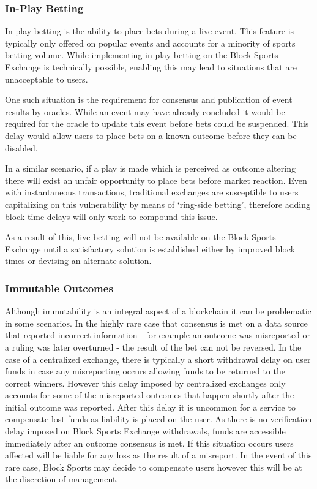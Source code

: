 \documentclass{article}
\begin{document}
		\subsubsection{In-Play Betting}
In-play betting is the ability to place bets during a live event. This feature is typically only offered on popular events and accounts for a minority of sports betting volume. While implementing in-play betting on the Block Sports Exchange is technically possible, enabling this may lead to situations that are unacceptable to users.
 
One such situation is the requirement for consensus and publication of event results by oracles. While an event may have already concluded it would be required for the oracle to update this event before bets could be suspended. This delay would allow users to place bets on a known outcome before they can be disabled.
 
In a similar scenario, if a play is made which is perceived as outcome altering there will exist an unfair opportunity to place bets before market reaction. Even with instantaneous transactions, traditional exchanges are susceptible to users capitalizing on this vulnerability by means of ‘ring-side betting’, therefore adding block time delays will only work to compound this issue. 

As a result of this, live betting will not be available on the Block Sports Exchange until a satisfactory solution is established either by improved block times or devising an alternate solution.

		\subsubsection{Immutable Outcomes}
Although immutability is an integral aspect of a blockchain it can be problematic in some scenarios. In the highly rare case that consensus is met on a data source that reported incorrect information - for example an outcome was misreported or a ruling was later overturned - the result of the bet can not be reversed. In the case of a centralized exchange, there is typically a short withdrawal delay on user funds in case any misreporting occurs allowing funds to be returned to the correct winners. However this delay imposed by centralized exchanges only accounts for some of the misreported outcomes that happen shortly after the initial outcome was reported. After this delay it is uncommon for a service to compensate lost funds as liability is placed on the user. As there is no verification delay imposed on Block Sports Exchange withdrawals, funds are accessible immediately after an outcome consensus is met. If this situation occurs users affected will be liable for any loss as the result of a misreport. In the event of this rare case, Block Sports may decide to compensate users however this will be at the discretion of management.
\end{document}
